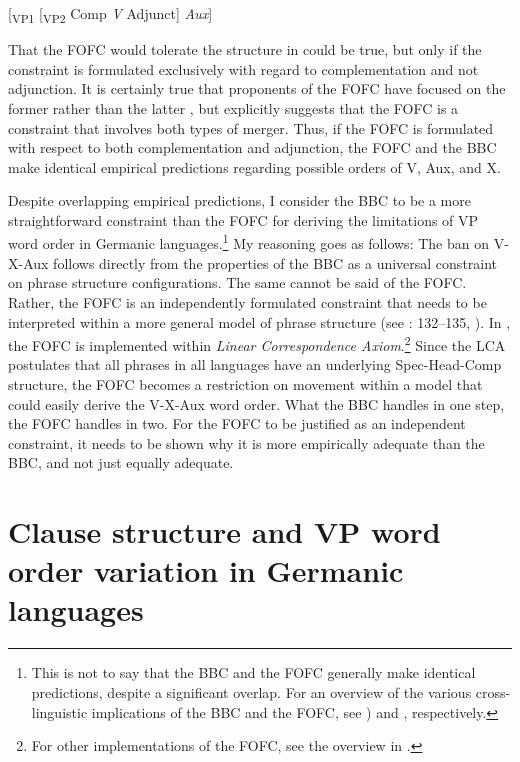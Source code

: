 \documentclass[output=paper, colorlinks, citecolor=brown]{langscibook}
\begin{document}
\ea {}[\textsubscript{VP1} [\textsubscript{VP2} {Comp} \textit{V} {Adjunct}] \textit{Aux}]\label{ex:sangfelt:10}\z


That the FOFC would tolerate the structure in  could be true, but only if the constraint is formulated exclusively with regard to complementation and not adjunction. It is certainly true that proponents of the FOFC have focused on the former rather than the latter \citep[97]{Sheehan2017Final}, but \citet{Sheehan2017Final} explicitly suggests that the FOFC is a constraint that involves both types of merger. Thus, if the FOFC is formulated with respect to both complementation and adjunction, the FOFC and the BBC make identical empirical predictions regarding possible orders of V, Aux, and X.

Despite overlapping empirical predictions, I consider the BBC to be a more straightforward constraint than the FOFC for deriving the limitations of VP word order in Germanic languages.\footnote{This is not to say that the BBC and the FOFC generally make identical predictions, despite a significant overlap. For an overview of the various cross-linguistic implications of the BBC and the FOFC, see \citealt[10–17, 65–94]{Haider2013}) and \citet[173–205]{BiberauerEtAl2014}, respectively.} My reasoning goes as follows: The ban on V-X-Aux follows directly from the properties of the BBC as a universal constraint on phrase structure configurations. The same cannot be said of the FOFC. Rather, the FOFC is an independently formulated constraint that needs to be interpreted within a more general model of phrase structure (see \citealt{Haider2013}: 132–135, \citealt[205–215]{BiberauerEtAl2014}). In \citet{BiberauerEtAl2014}, the FOFC is implemented within  \textit{Linear Correspondence Axiom}.\footnote{For other implementations of the FOFC, see the overview in \citet{Holmberg2017}.}  Since the LCA postulates that all phrases in all languages have an underlying Spec-Head-Comp structure, the FOFC becomes a restriction on movement within a model that could easily derive the V-X-Aux word order. What the BBC handles in one step, the FOFC handles in two. For the FOFC to be justified as an independent constraint, it needs to be shown why it is more empirically adequate than the BBC, and not just equally adequate.


\section{Clause structure and VP word order variation in Germanic languages}\label{sec:sangfelt:3}
\end{document}

